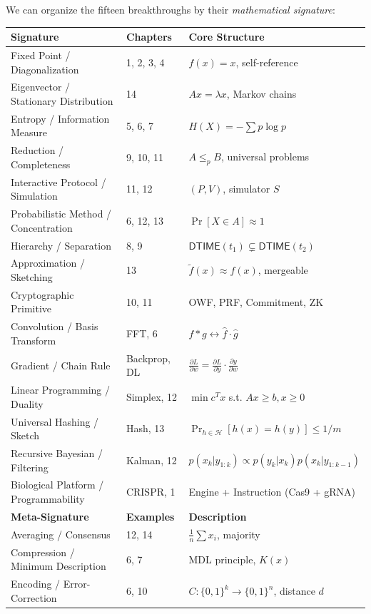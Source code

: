 We can organize the fifteen breakthroughs by their \emph{mathematical signature}:

\begin{center}
\begin{tabularx}{\textwidth}{@{}lXX@{}}
\toprule
\textbf{Signature} & \textbf{Chapters} & \textbf{Core Structure} \\
\midrule
Fixed Point / Diagonalization & 1, 2, 3, 4 & $f(x) = x$, self-reference \\
Eigenvector / Stationary Distribution & 14 & $Ax = \lambda x$, Markov chains \\
Entropy / Information Measure & 5, 6, 7 & $H(X) = -\sum p \log p$ \\
Reduction / Completeness & 9, 10, 11 & $A \le_p B$, universal problems \\
Interactive Protocol / Simulation & 11, 12 & $(P,V)$, simulator $S$ \\
Probabilistic Method / Concentration & 6, 12, 13 & $\Pr[X \in A] \approx 1$ \\
Hierarchy / Separation & 8, 9 & $\mathsf{DTIME}(t_1) \subsetneq \mathsf{DTIME}(t_2)$ \\
Approximation / Sketching & 13 & $\tilde{f}(x) \approx f(x)$, mergeable \\
Cryptographic Primitive & 10, 11 & OWF, PRF, Commitment, ZK \\
Convolution / Basis Transform & FFT, 6 & $f * g \leftrightarrow \hat{f} \cdot \hat{g}$ \\
Gradient / Chain Rule & Backprop, DL & $\frac{\partial L}{\partial w} = \frac{\partial L}{\partial y} \cdot \frac{\partial y}{\partial w}$ \\
Linear Programming / Duality & Simplex, 12 & $\min c^T x$ s.t. $Ax \ge b, x \ge 0$ \\
Universal Hashing / Sketch & Hash, 13 & $\Pr_{h \in \mathcal{H}}[h(x) = h(y)] \le 1/m$ \\
Recursive Bayesian / Filtering & Kalman, 12 & $p(x_k | y_{1:k}) \propto p(y_k | x_k) p(x_k | y_{1:k-1})$ \\
Biological Platform / Programmability & CRISPR, 1 & Engine + Instruction (Cas9 + gRNA) \\
\midrule
\textbf{Meta-Signature} & \textbf{Examples} & \textbf{Description} \\
Averaging / Consensus & 12, 14 & $\frac{1}{n}\sum x_i$, majority \\
Compression / Minimum Description & 6, 7 & MDL principle, $K(x)$ \\
Encoding / Error-Correction & 6, 10 & $C: \{0,1\}^k \to \{0,1\}^n$, distance $d$ \\
\bottomrule
\end{tabularx}
\end{center}

